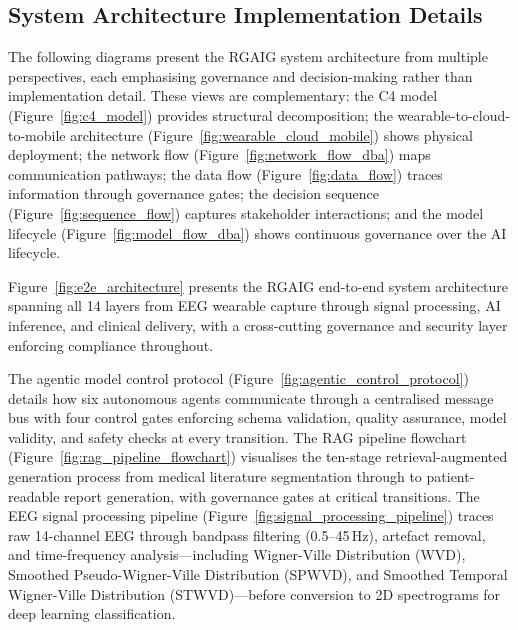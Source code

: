 \subsection{System Architecture Implementation Details}
\label{app:sec8_sys_arch}

\label{app_sec:system_architecture_diagrams}

The following diagrams present the RGAIG system architecture from multiple perspectives, each emphasising governance and decision-making rather than implementation detail. These views are complementary: the C4 model (Figure~\ref{fig:c4_model}) provides structural decomposition; the wearable-to-cloud-to-mobile architecture (Figure~\ref{fig:wearable_cloud_mobile}) shows physical deployment; the network flow (Figure~\ref{fig:network_flow_dba}) maps communication pathways; the data flow (Figure~\ref{fig:data_flow}) traces information through governance gates; the decision sequence (Figure~\ref{fig:sequence_flow}) captures stakeholder interactions; and the model lifecycle (Figure~\ref{fig:model_flow_dba}) shows continuous governance over the AI lifecycle.













Figure~\ref{fig:e2e_architecture} presents the RGAIG end-to-end system architecture spanning all 14 layers from EEG wearable capture through signal processing, AI inference, and clinical delivery, with a cross-cutting governance and security layer enforcing compliance throughout.



The agentic model control protocol (Figure~\ref{fig:agentic_control_protocol}) details how six autonomous agents communicate through a centralised message bus with four control gates enforcing schema validation, quality assurance, model validity, and safety checks at every transition. The RAG pipeline flowchart (Figure~\ref{fig:rag_pipeline_flowchart}) visualises the ten-stage retrieval-augmented generation process from medical literature segmentation through to patient-readable report generation, with governance gates at critical transitions. The EEG signal processing pipeline (Figure~\ref{fig:signal_processing_pipeline}) traces raw 14-channel EEG through bandpass filtering (0.5--45\,Hz), artefact removal, and time-frequency analysis---including Wigner-Ville Distribution (WVD), Smoothed Pseudo-Wigner-Ville Distribution (SPWVD), and Smoothed Temporal Wigner-Ville Distribution (STWVD)---before conversion to 2D spectrograms for deep learning classification.

